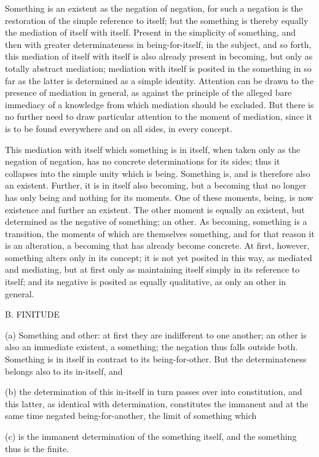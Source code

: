 Something is an existent as the negation of negation,
for such a negation is the restoration of
the simple reference to itself;
but the something is thereby equally
the mediation of itself with itself.
Present in the simplicity of something,
and then with greater determinateness
in being-for-itself,
in the subject, and so forth,
this mediation of itself with itself is
also already present in becoming,
but only as totally abstract mediation;
mediation with itself is posited in the something
in so far as the latter is determined as a simple identity.
Attention can be drawn to the presence of mediation in general,
as against the principle of the alleged bare immediacy of a knowledge
from which mediation should be excluded.
But there is no further need to draw
particular attention to the moment of mediation,
since it is to be found everywhere and on all sides,
in every concept.

This mediation with itself which something is in itself,
when taken only as the negation of negation,
has no concrete determinations for its sides;
thus it collapses into the simple unity which is being.
Something is, and is therefore also an existent.
Further, it is in itself also becoming,
but a becoming that no longer has only
being and nothing for its moments.
One of these moments, being, is now
existence and further an existent.
The other moment is equally an existent,
but determined as the negative of something; an other.
As becoming, something is a transition,
the moments of which are themselves something,
and for that reason it is an alteration,
a becoming that has already become concrete.
At first, however, something alters only in its concept;
it is not yet posited in this way, as mediated and mediating,
but at first only as maintaining itself
simply in its reference to itself;
and its negative is posited as equally qualitative,
as only an other in general.

B. FINITUDE

(a) Something and other:
at first they are indifferent to one another;
an other is also an immediate existent, a something;
the negation thus falls outside both.
Something is in itself in contrast to its being-for-other.
But the determinateness belongs also to its in-itself, and

(b) the determination of this in-itself
in turn passes over into constitution,
and this latter, as identical with determination,
constitutes the immanent and at the same time
negated being-for-another,
the limit of something which

(c) is the immanent determination of the something itself,
and the something thus is the finite.

